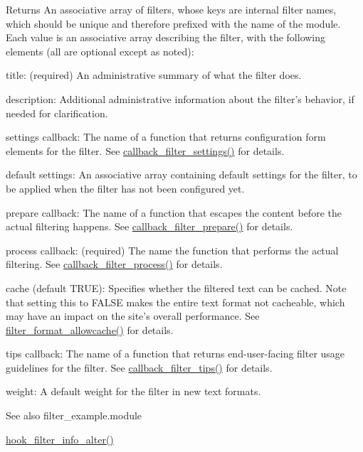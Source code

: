 \begin{DoxyReturn}{Returns}
An associative array of filters, whose keys are internal filter names, which should be unique and therefore prefixed with the name of the module. Each value is an associative array describing the filter, with the following elements (all are optional except as noted):
\begin{DoxyItemize}
\item title: (required) An administrative summary of what the filter does.
\item description: Additional administrative information about the filter's behavior, if needed for clarification.
\item settings callback: The name of a function that returns configuration form elements for the filter. See \hyperlink{group__callbacks_gac9ccfeb3980f8eaa8b3717e98a1e48e2}{callback\_\-filter\_\-settings()} for details.
\item default settings: An associative array containing default settings for the filter, to be applied when the filter has not been configured yet.
\item prepare callback: The name of a function that escapes the content before the actual filtering happens. See \hyperlink{group__callbacks_ga28144a42933a1bd6c183e758583f1039}{callback\_\-filter\_\-prepare()} for details.
\item process callback: (required) The name the function that performs the actual filtering. See \hyperlink{group__callbacks_ga5f82accd878d144a22ea2dfec253f91d}{callback\_\-filter\_\-process()} for details.
\item cache (default TRUE): Specifies whether the filtered text can be cached. Note that setting this to FALSE makes the entire text format not cacheable, which may have an impact on the site's overall performance. See \hyperlink{filter_8module_a3bbed48afc05f0a85c9f8a5e3bfd785f}{filter\_\-format\_\-allowcache()} for details.
\item tips callback: The name of a function that returns end-\/user-\/facing filter usage guidelines for the filter. See \hyperlink{group__callbacks_gabe5ee7c795e0adac0bccb8061006949e}{callback\_\-filter\_\-tips()} for details.
\item weight: A default weight for the filter in new text formats.
\end{DoxyItemize}
\end{DoxyReturn}
\begin{DoxySeeAlso}{See also}
filter\_\-example.module 

\hyperlink{group__hooks_ga7404a5c9b0c1cfe68383ae528bc8ebd4}{hook\_\-filter\_\-info\_\-alter()} 
\end{DoxySeeAlso}
